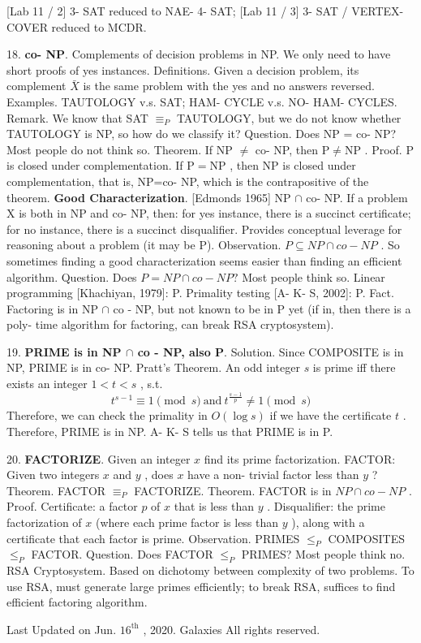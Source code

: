 \documentclass[10pt,a4paper]{article}
\begin{document}
[Lab 11 / 2] 3- SAT reduced to NAE- 4- SAT;
[Lab 11 / 3] 3- SAT / VERTEX- COVER reduced to MCDR.

18. \textbf{co- NP}. Complements of decision problems in NP. We only need to have short proofs of yes instances.
Definitions. Given a decision problem, its complement \(\bar{X}\) is the same problem with the yes and no answers reversed.
Examples. TAUTOLOGY v.s. SAT; HAM- CYCLE v.s. NO- HAM- CYCLES.
Remark. We know that SAT \(\equiv_{P}\) TAUTOLOGY, but we do not know whether TAUTOLOGY is NP, so how do we classify it?
Question. Does NP = co- NP? Most people do not think so.
Theorem. If NP \(\neq\) co- NP, then \(\mathrm{P}\neq \mathrm{NP}\) .
Proof. P is closed under complementation. If \(\mathrm{P} = \mathrm{NP}\) , then NP is closed under complementation, that is, NP=co- NP, which is the contrapositive of the theorem.
\textbf{Good Characterization}. [Edmonds 1965] NP \(\cap\) co- NP.
If a problem X is both in NP and co- NP, then: for yes instance, there is a succinct certificate; for no instance, there is a succinct disqualifier. Provides conceptual leverage for reasoning about a problem (it may be P).
Observation. \(P\subseteq NP\cap co - NP\) . So sometimes finding a good characterization seems easier than finding an efficient algorithm.
Question. Does \(P = NP\cap co - NP?\) Most people think so.
Linear programming [Khachiyan, 1979]: P. Primality testing [A- K- S, 2002]: P.
Fact. Factoring is in NP \(\cap\) co - NP, but not known to be in P yet (if in, then there is a poly- time algorithm for factoring, can break RSA cryptosystem).

19. \textbf{PRIME is in NP \(\cap\) co - NP, also P}.
Solution. Since COMPOSITE is in NP, PRIME is in co- NP.
Pratt's Theorem. An odd integer \(s\) is prime iff there exists an integer \(1< t< s\) , s.t.
\[
t^{s - 1}\equiv 1 \pmod s \mathrm{~and~} t^{\frac{s - 1}{p}}\neq 1 \pmod s
\]
Therefore, we can check the primality in \(O(\log s)\) if we have the certificate \(t\) . Therefore, PRIME is in NP.
A- K- S tells us that PRIME is in P.

20. \textbf{FACTORIZE}. Given an integer \(x\) find its prime factorization.
FACTOR: Given two integers \(x\) and \(y\) , does \(x\) have a non- trivial factor less than \(y\) ?
Theorem. FACTOR \(\equiv_{P}\) FACTORIZE.
Theorem. FACTOR is in \(NP \cap co - NP\) .
Proof. Certificate: a factor \(p\) of \(x\) that is less than \(y\) . Disqualifier: the prime factorization of \(x\) (where each prime factor is less than \(y\) ), along with a certificate that each factor is prime.
Observation. PRIMES \(\leq_{P}\) COMPOSITES \(\leq_{P}\) FACTOR.
Question. Does FACTOR \(\leq_{P}\) PRIMES? Most people think no.
RSA Cryptosystem. Based on dichotomy between complexity of two problems. To use RSA, must generate large primes efficiently; to break RSA, suffices to find efficient factoring algorithm.

Last Updated on Jun. \(16^{\mathrm{th}}\) , 2020. Galaxies All rights reserved.
\end{document}
